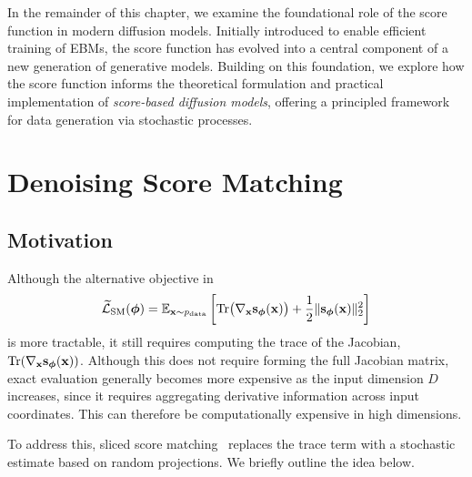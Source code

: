 In the remainder of this chapter, we examine the foundational role of the score function in modern diffusion models. Initially introduced to enable efficient training of EBMs, the score function has evolved into a central component of a new generation of generative models. Building on this foundation, we explore how the score function informs the theoretical formulation and practical implementation of \emph{score-based diffusion models}, offering a principled framework for data generation via stochastic processes.


\clearpage
\newpage


\section{\texorpdfstring{Denoising Score Matching}{Denoising Score Matching}}\label{sec:dsm}

\subsection{Motivation}
Although the alternative objective in 
\begin{align*}
    \widetilde{\mathcal{L}}_{\text{SM}}(\bm{\phi}) = \mathbb{E}_{{\mathbf{x}} \sim p_{\mathrm{data}}} \left[\mathrm{Tr}\big(\nabla_{{\mathbf{x}}}{\mathbf{s}}_{\bm{\phi}}({\mathbf{x}})\big) + \frac{1}{2} \|{\mathbf{s}}_{\bm{\phi}}({\mathbf{x}})\|_2^2 \right]
\end{align*}
is more tractable, it still requires computing the trace of the Jacobian, $\mathrm{Tr}(\nabla_{{\mathbf{x}}}{\mathbf{s}}_{\bm{\phi}}({\mathbf{x}}))$. Although this does not require forming the full Jacobian matrix, exact evaluation generally becomes more expensive as the input dimension $D$ increases, since it requires aggregating derivative information across input coordinates. This can therefore be computationally expensive in high dimensions.


To address this, sliced score matching~\citep{song2020sliced} replaces the trace term with a stochastic estimate based on random projections. We briefly outline the idea below.
